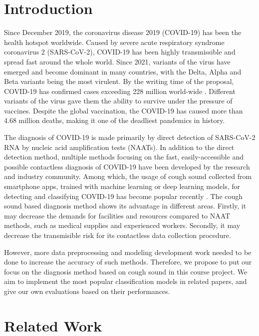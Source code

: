 \documentclass[11pt]{article}
\begin{document}
\section{Introduction}

Since December 2019, the coronavirus disease 2019 (COVID-19) has been the health hotspot worldwide. Caused by severe acute respiratory syndrome coronavirus 2 (SARS-CoV-2), COVID-19 has been highly transmissible and spread fast around the whole world. Since 2021, variants of the virus have emerged and become dominant in many countries, with the Delta, Alpha and Beta variants being the most virulent. By the writing time of the proposal, COVID-19 has confirmed cases exceeding 228 million world-wide \cite{wiki2021covid19}. Different variants of the virus gave them the ability to survive under the pressure of vaccines. Despite the global vaccination, the COVID-19 has caused more than  4.68 million deaths, making it one of the deadliest pandemics in history.

The diagnosis of COVID-19 is made primarily by direct detection of SARS-CoV-2 RNA by nucleic acid amplification tests (NAATs). In addition to the direct detection method, multiple methods focusing on the fast, easily-accessible and possible contactless diagnosis of COVID-19 have been developed by the research and industry community. Among which, the usage of cough sound collected from smartphone apps, trained with machine learning or deep learning models, for detecting and classifying COVID-19 has become popular recently \cite{xue2021exploring}. The cough sound based diagnosis method shows its advantage in different areas. Firstly, it may decrease the demands for facilities and resources compared to NAAT methods, such as medical supplies and experienced workers. Secondly, it may decrease the transmisible risk for its contactless data collection procedure.

However, more data preprocessing and modeling development work needed to be done to increase the accuracy of such methods. Therefore, we propose to put our focus on the diagnosis method based on cough sound in this course project. We aim to implement the most popular classification models in related papers, and give our own evaluations based on their performances.

\section{Related Work}
\end{document}
